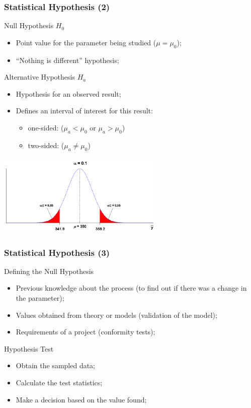 \documentclass[10pt]{beamer}
\begin{document}
\begin{frame}
  \frametitle{Statistical Hypothesis (2)}
  \begin{block}{Null Hypothesis $H_0$}
    \begin{itemize}
    \item Point value for the parameter being studied ($\mu = \mu_0$);
    \item ``Nothing is different'' hypothesis;
    \end{itemize}
  \end{block}
  
  \begin{block}{Alternative Hypothesis $H_a$}
    \begin{itemize}
    \item Hypothesis for an observed result;
    \item Defines an interval of interest for this result:
      \begin{itemize}
      \item one-sided: ($\mu_a < \mu_0$ or $\mu_a > \mu_0$)
      \item two-sided: ($\mu_a \neq \mu_0$)
      \end{itemize}
    \end{itemize}
  \end{block}
  
  \includegraphics[width=0.6\textwidth]{img/normaldist}
\end{frame}


\begin{frame}
  \frametitle{Statistical Hypothesis (3)}

  \begin{block}{Defining the Null Hypothesis}
    \begin{itemize}
    \item Previous knowledge about the process (to find out if there
      was a change in the parameter);
    \item Values obtained from theory or models (validation of the
      model);
    \item Requirements of a project (conformity tests);
    \end{itemize}
  \end{block}
  \medskip

  \begin{block}{Hypothesis Test}
    \begin{itemize}
    \item Obtain the sampled data;
    \item Calculate the test statistics;
    \item Make a decision based on the value found;
    \end{itemize}
  \end{block}
\end{frame}
\end{document}
